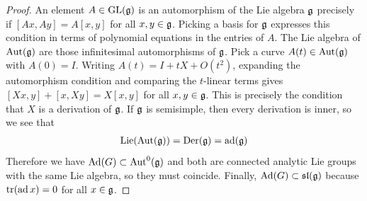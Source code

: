 \documentclass[12pt]{article}
\begin{document}
\begin{proof}
    An element $A \in \operatorname{GL}(\mathfrak{g})$ is an automorphism of the Lie algebra $\mathfrak{g}$ precisely if $[Ax,Ay] = A[x,y]$ for all $x,y \in \mathfrak{g}$. Picking a basis for $\mathfrak{g}$ expresses this condition in terms of polynomial equations in the entries of $A$.  The Lie algebra of $\operatorname{Aut}(\mathfrak{g})$ are those infinitesimal automorphisms of $\mathfrak{g}$. Pick a curve $A(t) \in \operatorname{Aut}(\mathfrak{g})$ with $A(0) = I$. Writing $A(t) = I + tX + O(t^2)$, expanding the automorphism condition and comparing the $t$-linear terms gives $[Xx,y] + [x,Xy] = X[x,y]$ for all $x,y \in \mathfrak{g}$. This is precisely the condition that $X$ is a derivation of $\mathfrak{g}$. If $\mathfrak{g}$ is semisimple, then every derivation is inner, so we see that \begin{align*}
        \operatorname{Lie}(\operatorname{Aut}(\mathfrak{g})) = \operatorname{Der}(\mathfrak{g}) = \operatorname{ad}(\mathfrak{g})
    \end{align*} Therefore we have $\operatorname{Ad}(G) \subset \operatorname{Aut}^0(\mathfrak{g})$ and both are connected analytic Lie groups with the same Lie algebra, so they must coincide. Finally, $\operatorname{Ad}(G) \subset \mathfrak{sl}(\mathfrak{g})$ because $\operatorname{tr}(\operatorname{ad} x) = 0$ for all $x \in \mathfrak{g}$.
\end{proof}
\end{document}
